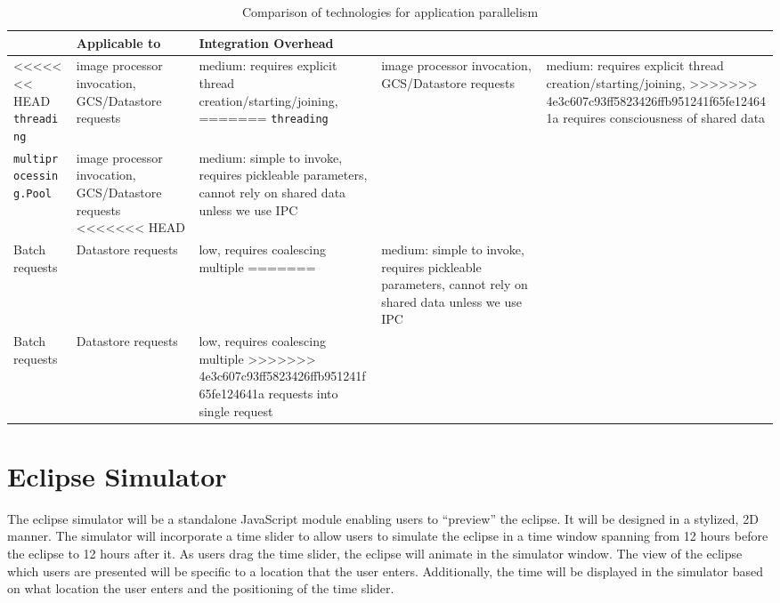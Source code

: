 \documentclass[10pt, onecolumn, draftclsnofoot, letterpaper, compsoc]{IEEEtran}
\begin{document}
\begin{table}[h]
\centering
\caption{Comparison of technologies for application parallelism}
\begin{tabular}{|p{4.2cm}|p{4.2cm}|p{4.2cm}|}
\hline

 & Applicable to & Integration Overhead \\ \hline

<<<<<<< HEAD
{\tt threading} & image processor invocation, GCS/Datastore requests
& medium: requires explicit thread creation/starting/joining,
=======
{\tt threading} & image processor invocation, GCS/Datastore requests
& medium: requires explicit thread creation/starting/joining,
>>>>>>> 4e3c607c93ff5823426ffb951241f65fe124641a
requires consciousness of shared data \\ \hline

{\tt multiprocessing.Pool} & image processor invocation, GCS/Datastore requests
<<<<<<< HEAD
& medium: simple to invoke, requires pickleable parameters, cannot rely
on shared data unless we use IPC \\ \hline

Batch requests & Datastore requests & low, requires coalescing multiple
=======
& medium: simple to invoke, requires pickleable parameters, cannot rely
on shared data unless we use IPC \\ \hline

Batch requests & Datastore requests & low, requires coalescing multiple
>>>>>>> 4e3c607c93ff5823426ffb951241f65fe124641a
requests into single request  \\ \hline

\end{tabular}
\label{table:bret3}
\end{table}

\section{Eclipse Simulator}
The eclipse simulator will be a standalone JavaScript module enabling users to
“preview” the eclipse. It will be designed in a stylized, 2D manner.
The simulator will incorporate a time slider to allow users to simulate
the eclipse in a time window spanning from 12 hours before the eclipse to 12
hours after it. As users drag the time slider, the eclipse will animate in the
simulator window. The view of the eclipse which users are presented will be
specific to a location that the user enters. Additionally, the time will be
displayed in the simulator based on what location the user enters and the
positioning of the time slider.
\end{document}
